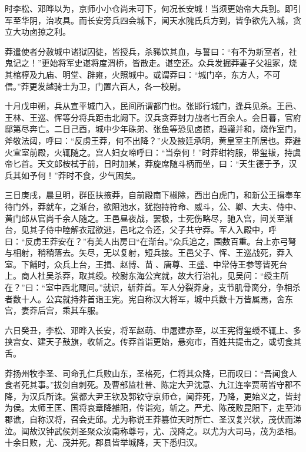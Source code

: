 \documentclass[12pt,UTF8]{ctexbook}
\begin{document}
时李松、邓晔以为，京师小小仓尚未可下，何况长安城！当须更始帝大兵到。即引军至华阴，治攻具。而长安旁兵四会城下，闻天水隗氏兵方到，皆争欲先入城，贪立大功卤掠之利。



莽遣使者分赦城中诸狱囚徒，皆授兵，杀豨饮其血，与誓曰：“有不为新室者，社鬼记之！”更始将军史谌将度渭桥，皆散走。谌空还。众兵发掘莽妻子父祖冢，烧其棺椁及九庙、明堂、辟雍，火照城中。或谓莽曰：“城门卒，东方人，不可信。”莽更发越骑士为卫，门置六百人，各一校尉。



十月戊申朔，兵从宣平城门入，民间所谓都门也。张邯行城门，逢兵见杀。王邑、王林、王巡、恽等分将兵距击北阙下。汉兵贪莽封力战者七百余人。会日暮，官府邸第尽奔亡。二日己酉，城中少年硃弟、张鱼等恐见卤掠，趋讙并和，烧作室门，斧敬法闼，呼曰：“反虏王莽，何不出降？”火及掖廷承明，黄皇室主所居也。莽避火宣室前殿，火辄随之。宫人妇女啼呼曰：“当奈何！”时莽绀袀服，带玺韨，持虞帝匕首。天文郎桉栻于前，日时加某，莽旋席随斗柄而坐，曰：“天生德于予，汉兵其如予何！”莽时不食，少气困矣。



三日庚戌，晨旦明，群臣扶掖莽，自前殿南下椒除，西出白虎门，和新公王揖奉车待门外，莽就车，之渐台，欲阻池水，犹抱持符命、威斗，公、卿、大夫、侍中、黄门郎从官尚千余人随之。王邑昼夜战，罢极，士死伤略尽，驰入宫，间关至渐台，见其子侍中睦解衣冠欲逃，邑叱之令还，父子共守莽。军人入殿中，呼曰：“反虏王莽安在？”有美人出房曰“在渐台。”众兵追之，围数百重。台上亦弓弩与相射，稍稍落去。矢尽，无以复射，短兵接。王邑父子、恽、王巡战死，莽入室。下餔时，众兵上台，王揖、赵博、苗、唐尊、王盛、中常侍王参等皆死台上。商人杜吴杀莽，取其绶。校尉东海公宾就，故大行治礼，见吴问：“绶主所在？”曰：“室中西北陬间。”就识，斩莽首。军人分裂莽身，支节肌骨脔分，争相杀者数十人。公宾就持莽首诣王宪。宪自称汉大将军，城中兵数十万皆属焉，舍东宫，妻莽后宫，乘其车服。



六日癸丑，李松、邓晔入长安，将军赵萌、申屠建亦至，以王宪得玺绶不辄上、多挟宫女、建天子鼓旗，收斩之。传莽首诣更始，悬宛市，百姓共提击之，或切食其舌。



莽扬州牧李圣、司命孔仁兵败山东，圣格死，仁将其众降，已而叹曰：“吾闻食人食者死其事。”拔剑自刺死。及曹部监杜普、陈定大尹沈意、九江连率贾萌皆守郡不降，为汉兵所诛。赏都大尹王钦及郭钦守京师仓，闻莽死，乃降，更始义之，皆封为侯。太师王匡、国将哀章降雒阳，传诣宛，斩之。严尤、陈茂败昆阳下，走至沛郡谯，自称汉将，召会吏邱。尤为称说王莽篡位天时所亡、圣汉复兴状，茂伏而涕泣。闻故汉钟武侯刘圣聚众汝南称尊号，尤、茂降之。以尤为大司马，茂为丞相。十余日败，尤、茂并死。郡县皆举城降，天下悉归汉。
\end{document}
